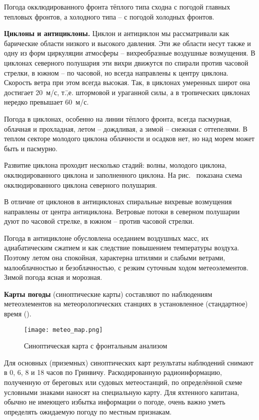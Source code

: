 Погода окклюдированного фронта тёплого типа сходна с погодой главных
тепловых фронтов, а холодного типа \--- с погодой холодных фронтов.

\textbf{Циклоны и антициклоны.} Циклон
и антициклон мы рассматривали как барические области низкого и
высокого давления. Эти же области несут также и одну из форм
циркуляции атмосферы \--- вихреобразные воздушные возмущения. В
циклонах северного полушария эти вихри движутся по спирали против
часовой стрелки, в южном \--- по часовой, но всегда направлены к
центру циклона. Скорость ветра при этом всегда высокая. Так, в
циклонах умеренных широт она достигает 20~м/с,
т.\=,е. штормовой и ураганной силы, а в тропических циклонах нередко
превышает 60~м/с.

Погода в циклонах, особенно на линии тёплого фронта, всегда пасмурная,
облачная и прохладная, летом \--- дождливая, а зимой \--- снежная с
оттепелями. В теплом секторе молодого циклона облачности и осадков
нет, но над морем может быть и пасмурно.

Развитие циклона проходит несколько стадий: волны, молодого циклона,
окклюдированного циклона и заполненного циклона. На рис.~
показана схема окклюдированного циклона северного полушария.

В отличие от циклонов в антициклонах спиральные вихревые возмущения
направлены от центра антициклона. Ветровые потоки в северном полушарии
дуют по часовой стрелке, в южном \--- против часовой стрелки.

Погода в антициклоне обусловлена оседанием воздушных масс, их
адиабатическим сжатием и как следствие повышением температуры
воздуха. Поэтому летом она спокойная, характерна штилями и слабыми
ветрами, малооблачностью и безоблачностью, с резким суточным ходом
метеоэлементов. Зимой погода ясная и морозная.

\textbf{Карты погоды} (синоптические карты)
 составляют по
наблюдениям метеоэлементов на метеорологических станциях в
установленное (стандартное) время ().

\begin{figure*}[!htb]
  \centering{}
  \texttt{[image: meteo\_map.png]}
  \caption{Синоптическая карта с фронтальным анализом}
  \label{fig:meteo_map}
\end{figure*}

Для основных (приземных) синоптических карт результаты наблюдений
снимают в 0, 6, 8 и 18 часов по Гринвичу. Раскодированную
радиоинформацию, полученную от береговых или судовых метеостанций, по
определённой схеме условными знаками наносят на специальную карту. Для
яхтенного капитана, обычно не имеющего избытка информации о погоде,
очень важно уметь определять ожидаемую погоду по местным признакам.

